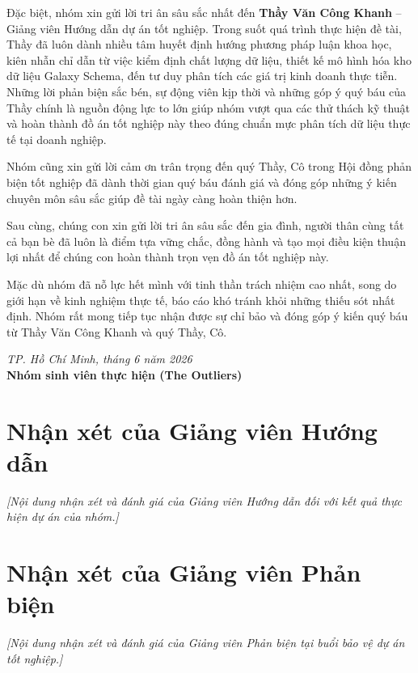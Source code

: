 \documentclass[12pt, a4paper]{report}
\begin{document}
Đặc biệt, nhóm xin gửi lời tri ân sâu sắc nhất đến \textbf{Thầy Văn Công Khanh} -- Giảng viên Hướng dẫn dự án tốt nghiệp. Trong suốt quá trình thực hiện đề tài, Thầy đã luôn dành nhiều tâm huyết định hướng phương pháp luận khoa học, kiên nhẫn chỉ dẫn từ việc kiểm định chất lượng dữ liệu, thiết kế mô hình hóa kho dữ liệu Galaxy Schema, đến tư duy phân tích các giá trị kinh doanh thực tiễn. Những lời phản biện sắc bén, sự động viên kịp thời và những góp ý quý báu của Thầy chính là nguồn động lực to lớn giúp nhóm vượt qua các thử thách kỹ thuật và hoàn thành đồ án tốt nghiệp này theo đúng chuẩn mực phân tích dữ liệu thực tế tại doanh nghiệp.

Nhóm cũng xin gửi lời cảm ơn trân trọng đến quý Thầy, Cô trong Hội đồng phản biện tốt nghiệp đã dành thời gian quý báu đánh giá và đóng góp những ý kiến chuyên môn sâu sắc giúp đề tài ngày càng hoàn thiện hơn.

Sau cùng, chúng con xin gửi lời tri ân sâu sắc đến gia đình, người thân cùng tất cả bạn bè đã luôn là điểm tựa vững chắc, đồng hành và tạo mọi điều kiện thuận lợi nhất để chúng con hoàn thành trọn vẹn đồ án tốt nghiệp này.

Mặc dù nhóm đã nỗ lực hết mình với tinh thần trách nhiệm cao nhất, song do giới hạn về kinh nghiệm thực tế, báo cáo khó tránh khỏi những thiếu sót nhất định. Nhóm rất mong tiếp tục nhận được sự chỉ bảo và đóng góp ý kiến quý báu từ Thầy Văn Công Khanh và quý Thầy, Cô.

\vspace{0.8cm}
\begin{flushright}
    \textit{TP. Hồ Chí Minh, tháng 6 năm 2026} \\
    \textbf{Nhóm sinh viên thực hiện (The Outliers)}
\end{flushright}

\chapter*{Nhận xét của Giảng viên Hướng dẫn}
\textit{[Nội dung nhận xét và đánh giá của Giảng viên Hướng dẫn đối với kết quả thực hiện dự án của nhóm.]}

\chapter*{Nhận xét của Giảng viên Phản biện}
\textit{[Nội dung nhận xét và đánh giá của Giảng viên Phản biện tại buổi bảo vệ dự án tốt nghiệp.]}
\end{document}
